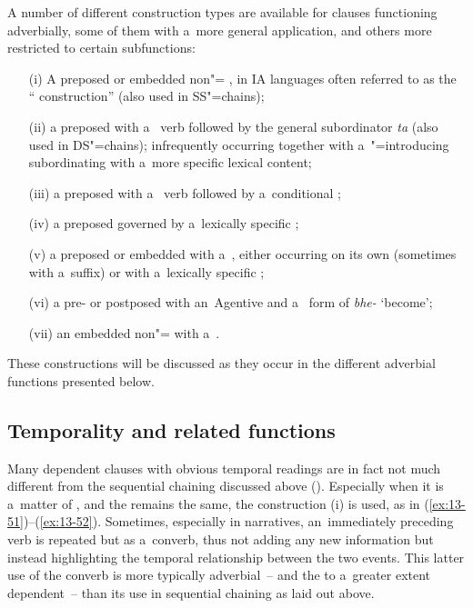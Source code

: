 A number of different construction types are available for clauses functioning adverbially, some of them with a~more general application, and others more restricted to certain subfunctions:


\begin{enumerate}
\item[(i)] A preposed or embedded non"=  , in IA languages often referred to as the `` construction'' (also used in SS"=chains);

\item[(ii)] a preposed  with a~ verb followed by the general subordinator \textit{ta} (also used in DS"=chains); infrequently occurring together with a~"=introducing subordinating  with a~more specific lexical content;

\item[(iii)] a preposed  with a~ verb followed by a~conditional ;

\item[(iv)] a preposed   governed by a~lexically specific ;

\item[(v)] a preposed or embedded  with a~, either occurring on its own (sometimes with a~suffix) or with a~lexically specific ;

\item[(vi)] a pre- or postposed  with an~Agentive  and a~ form of \textit{bhe-} `become';

\item[(vii)] an embedded non"=  with a~.
\end{enumerate}

These constructions will be discussed as they occur in the different adverbial functions presented below. 


\subsection{Temporality and related functions}
\label{subsec:13-4-1}

 Many dependent clauses with obvious temporal readings are in fact not much different from the sequential chaining discussed above (). Especially when it is a~matter of , and the  remains the same, the  construction (i) is used, as in (\ref{ex:13-51})--(\ref{ex:13-52}). Sometimes, especially in narratives, an~immediately preceding  verb is repeated but as a~converb, thus not adding any new information but instead highlighting the temporal relationship between the two events. This latter use of the converb is more typically adverbial~-- and the   to a~greater extent dependent~-- than its use in sequential chaining as laid out above.

